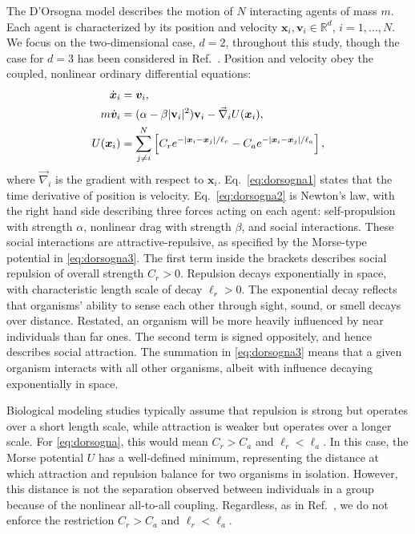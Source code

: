 \documentclass[%
 aip,
reprint,
 amsmath,amssymb,
 aps,
showkeys
]{revtex4-1}
\begin{document}
The D'Orsogna model\cite{DorChuBer2006,ChuDorMar2007} describes the motion of $N$ interacting agents of mass $m$. Each agent is characterized by its position and velocity $\boldsymbol{x}_i, \boldsymbol{v}_i \in \mathbb{R}^d$, $i = 1,\ldots,N$. We focus on the two-dimensional case, $d=2$, throughout this study, though the case for $d=3$ has been considered in Ref.~.  Position and velocity obey the coupled, nonlinear ordinary differential equations:
\begin{subequations}
\label{eq:dorsogna}
\begin{align}
\dot{\boldsymbol{x}}_{i} & =\boldsymbol{v}_{i},\label{eq:dorsogna1}\\
m\dot{\boldsymbol{v}}_{i} & =(\alpha-\beta|\text{\textbf{v}}_{i}|^{2})\text{\textbf{v}}_{i}-\vec{\nabla}_{i}U(\text{\ensuremath{\boldsymbol{x}}}_{i}),\label{eq:dorsogna2}\\
U(\boldsymbol{x}_{i}) & =\sum_{j\ne i}^{N}\left[C_{r}e^{-|\boldsymbol{x}_{i}-\boldsymbol{x}_{j}|/\ell_{r}}-C_{a}e^{-|\boldsymbol{x}_{i}-\boldsymbol{x}_{j}|/\ell_{a}}\right]\label{eq:dorsogna3},
\end{align}
\end{subequations}
where $\vec{\nabla}_{i}$ is the gradient with respect to $\boldsymbol{x}_i$. Eq.~\eqref{eq:dorsogna1}  states that the time derivative of position is velocity. Eq.~\eqref{eq:dorsogna2} is Newton's law, with the right hand side describing three forces acting on each agent: self-propulsion with strength $\alpha$, nonlinear drag with strength $\beta$, and social interactions. These social interactions are attractive-repulsive, as specified by the Morse-type potential in \eqref{eq:dorsogna3}. The first term inside the brackets describes social repulsion of overall strength $C_r > 0$. Repulsion decays exponentially in space, with characteristic length scale of decay $\ell_r > 0$. The exponential decay reflects that organisms' ability to sense each other through sight, sound, or smell decays over distance. Restated, an organism will be more heavily influenced by near individuals than far ones. The second term is signed oppositely, and hence describes social attraction. The summation in \eqref{eq:dorsogna3} means that a given organism interacts with all other organisms, albeit with influence decaying exponentially in space.

Biological modeling studies typically assume that repulsion is strong but operates over a short length scale, while attraction is weaker but operates over a longer scale. For \eqref{eq:dorsogna}, this would mean $C_r > C_a$ and $\ell_r < \ell_a$. In this case, the Morse potential $U$ has a well-defined minimum, representing the distance at which attraction and repulsion balance for two organisms in isolation. However, this distance is not the separation observed between individuals in a group because of the nonlinear all-to-all coupling. Regardless, as in Ref.~, we do not enforce the restriction $C_r > C_a$ and $\ell_r < \ell_a$. 
\end{document}
